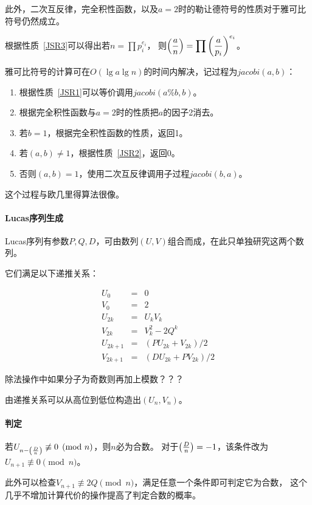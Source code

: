 此外，二次互反律，完全积性函数，以及$a=2$时的勒让德符号的性质对于雅可比符号仍然成立。

根据性质~\ref{JSR3}可以得出若$\displaystyle n=\prod{p_i^{e_i}}$，
则$\displaystyle \left(\frac{a}{n}\right)=\prod{\left(\frac{a}{p_i}\right)^{e_i}}$。

雅可比符号的计算可在$O(\lg a\lg n)$的时间内解决，记过程为$jacobi(a,b)$：

\begin{enumerate}
    \item 根据性质~\ref{JSR1}可以等价调用$jacobi(a\%b,b)$。
    \item 根据完全积性函数与$a=2$时的性质把$a$的因子2消去。
    \item 若$b=1$，根据完全积性函数的性质，返回1。
    \item 若$(a,b)\neq 1$，根据性质~\ref{JSR2}，返回0。
    \item 否则$(a,b)=1$，使用二次互反律调用子过程$jacobi(b,a)$。
\end{enumerate}

这个过程与欧几里得算法很像。

\paragraph{Lucas序列生成}
Lucas序列有参数$P,Q,D$，可由数列$(U,V)$组合而成，在此只单独研究这两个数列。

它们满足以下递推关系：

\begin{eqnarray*}
    U_0&=&0\\
    V_0&=&2\\
    U_{2k}&=&U_kV_k\\
    V_{2k}&=&V_k^2-2Q^k\\
    U_{2k+1}&=&(PU_{2k}+V_{2k})/2\\
    V_{2k+1}&=&(DU_{2k}+PV_{2k})/2
\end{eqnarray*}

除法操作中如果分子为奇数则再加上模数？？？

由递推关系可以从高位到低位构造出$(U_n,V_n)$。

\paragraph{判定}
若$U_{n-\left(\frac{D}{n}\right)}\not \equiv 0\pmod{n}$，则$n$必为合数。
对于$\left(\frac{D}{n}\right)=-1$，该条件改为$U_{n+1}\not \equiv 0\pmod{n}$。

此外可以检查$V_{n+1}\not \equiv 2Q \pmod{n}$，满足任意一个条件即可判定它为合数，
这个几乎不增加计算代价的操作提高了判定合数的概率。
